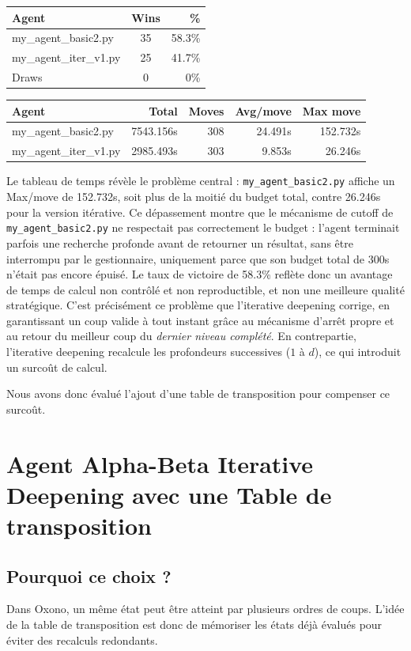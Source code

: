 \begin{tabular}{|l|c|r|}
    \hline
    Agent & Wins & \% \\
    \hline
    my\_agent\_basic2.py & 35 & 58.3\% \\
    my\_agent\_iter\_v1.py & 25 & 41.7\% \\
    Draws & 0 & 0\%\\
    \hline 
\end{tabular}
\begin{tabular}{|l|r|r|r|r|}
    \hline
    Agent & Total & Moves & Avg/move & Max move \\
    \hline
    my\_agent\_basic2.py & 7543.156s & 308 & 24.491s & 152.732s \\
    my\_agent\_iter\_v1.py & 2985.493s & 303 & 9.853s & 26.246s \\
    \hline
\end{tabular}

\bigskip
Le tableau de temps révèle le problème central : \texttt{my\_agent\_basic2.py} affiche un Max/move de 152.732s, soit plus de la moitié du budget total, contre 26.246s pour la version itérative. Ce dépassement montre que le mécanisme de cutoff de \texttt{my\_agent\_basic2.py} ne respectait pas correctement le budget : l'agent terminait parfois une recherche profonde avant de retourner un résultat, sans être interrompu par le gestionnaire, uniquement parce que son budget total de 300s n'était pas encore épuisé. Le taux de victoire de 58.3\% reflète donc un avantage de temps de calcul non contrôlé et non reproductible, et non une meilleure qualité stratégique. C'est précisément ce problème que l'iterative deepening corrige, en garantissant un coup valide à tout instant grâce au mécanisme d'arrêt propre et au retour du meilleur coup du \textit{dernier niveau complété}. En contrepartie, l'iterative deepening recalcule les profondeurs successives ($1$ à $d$), ce qui introduit un surcoût de calcul.

Nous avons donc évalué l'ajout d'une table de transposition pour compenser ce surcoût.


\section{Agent Alpha-Beta Iterative Deepening avec une Table de transposition}

\subsection{Pourquoi ce choix ?}
Dans Oxono, un même état peut être atteint par plusieurs ordres de coups. L'idée de la table de transposition est donc de mémoriser les états déjà évalués pour éviter des recalculs redondants.

